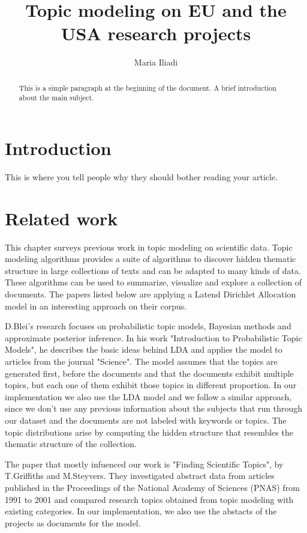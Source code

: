 \documentclass[12pt]{report}
\title{Topic modeling on EU and the USA research projects}
\author{Maria Iliadi}
\begin{document}
\maketitle
\tableofcontents


\begin{abstract}
This is a simple paragraph at the beginning of the document. 
A brief introduction about the main subject.
\end{abstract}


\section{Introduction}
This is where you tell people why they should bother reading your article.

\section{Related work}

This chapter surveys previous work in topic modeling on scientific data. Topic
modeling algorithms provides a suite of algorithms to discover hidden thematic
structure in large collections of texts and can be adapted to many kinds of
data. These algorithms can be used to summarize, visualize and explore a
collection of documents. The papers listed below are applying a Latend Dirichlet
Allocation model in an interesting approach on their corpus.

D.Blei's research focuses on probabilistic topic models, Bayesian methods and
approximate posterior inference. In his work "Introduction to Probabilistic
Topic Models",\cite{Blei11introductionto} he describes the basic ideas behind
LDA and applies the model to articles from the journal "Science". The model
assumes that the topics are generated first, before the documents and that the
documents exhibit multiple topics, but each one of them exhibit those topics in
different proportion. In our implementation we also use the LDA model and we
follow a similar approach, since we don't use any previous information about the
subjects that run through our dataset and the documents are not labeled with
keywords or topics. The topic distributions arise by computing the hidden
structure that resembles the thematic structure of the collection.

The paper that mostly infuenced our work is "Finding Scientific Topics", by
T.Griffiths and M.Steyvers.\cite{griffiths_steyvers04} They investigated
abstract data from articles published in the Proceedings of the National Academy
of Sciences (PNAS) from 1991 to 2001 and compared research topics obtained from
topic modeling with existing categories. In our implementation, we also use 
the abstacts of the projects as documents for the model.
\end{document}
